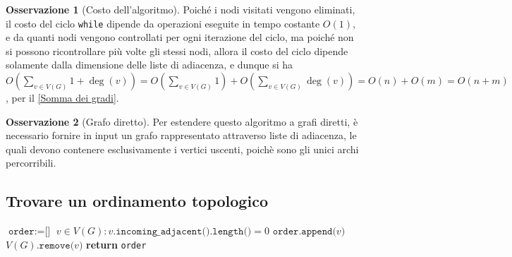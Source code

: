 \documentclass[14pt]{extreport}
\theoremstyle{definition}
\theoremstyle{definition}
\newtheorem{remark}{Osservazione}[subsection]
\begin{document}
\begin{remark}[Costo dell'algoritmo]
    \label{costo findReachableNodes2}
    Poiché i nodi visitati vengono eliminati, il costo del ciclo \texttt{while} dipende da operazioni eseguite in tempo costante $O(1)$, e da quanti nodi vengono controllati per ogni iterazione del ciclo, ma poiché non si possono ricontrollare più volte gli stessi nodi, allora il costo del ciclo dipende solamente dalla dimensione delle liste di adiacenza, e dunque si ha $\displaystyle O\left( \sum_{v \in V(G)}{1 + \deg(v)}\right)=O\left(\sum_{v \in V(G)}{1}\right) + O\left(\sum_{v \in V(G)}{\deg(v)}\right) = O(n) + O(m) = O(n+ m)$, per il \cref{Somma dei gradi}.
\end{remark}

\begin{remark}[Grafo diretto]
    Per estendere questo algoritmo a grafi diretti, è necessario fornire in input un grafo rappresentato attraverso liste di adiacenza, le quali devono contenere esclusivamente i vertici uscenti, poichè sono gli unici archi percorribili.
\end{remark}

\subsection{Trovare un ordinamento topologico}

\begin{algorithm}[H]
    \caption{
        Dato un grafo diretto aciclico $G$, l'algoritmo restituisce un suo ordinamento topologico.\\
        \textbf{Input}: $G$ grafo diretto aciclico.\\
        \textbf{Output}: un ordinamento topologico di $G$.
    }

    \begin{algorithmic}[1]
            \State $\texttt{order} := \texttt{[}\texttt{]}$
                \State $v \in V(G) : v.\texttt{incoming\_adjacent().length()} = 0$
                \State $\texttt{order.append(}v\texttt{)}$
                \State $V(G)\texttt{.remove(}v\texttt{)}$
            \EndWhile
            \State \textbf{return} \texttt{order}
        \EndFunction
    \end{algorithmic}
\end{algorithm}
\end{document}

